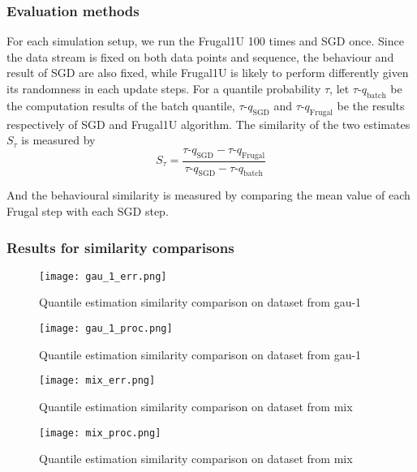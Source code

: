 \subsubsection{Evaluation methods}

For each simulation setup, we run the Frugal1U 100 times and SGD once. Since the data stream is fixed on both data points and sequence, the behaviour and result of SGD are also fixed, while Frugal1U is likely to perform differently given its randomness in each update steps. For a quantile probability $\tau$, let $\tau$-$q_{\text{batch}}$ be the computation results of the batch quantile, $\tau$-$q_{\text{SGD}}$ and $\tau$-$q_{\text{Frugal}}$ be the results respectively of SGD and Frugal1U algorithm. The similarity of the two estimates $S_\tau$ is measured by
\begin{equation}
    S_\tau = \frac{ \tau\text{-}q_{\text{SGD}} - \tau\text{-}q_{\text{Frugal}} }{ \tau\text{-}q_{\text{SGD}} - \tau\text{-}q_{\text{batch}} }
\end{equation}

And the behavioural similarity is measured by comparing the mean value of each Frugal step with each SGD step.


\subsubsection{Results for similarity comparisons}

\begin{figure}[h!]
    \centering
	\texttt{[image: gau\_1\_err.png]}
    \caption{Quantile estimation similarity comparison on dataset from gau-1}
    \label{fig: gau_1_err}
\end{figure}

\begin{figure}[h!]
    \centering
	\texttt{[image: gau\_1\_proc.png]}
    \caption{Quantile estimation similarity comparison on dataset from gau-1}
    \label{fig: gau_1_proc}
\end{figure}

\begin{figure}[h!]
    \centering
	\texttt{[image: mix\_err.png]}
    \caption{Quantile estimation similarity comparison on dataset from mix}
    \label{fig: mix_err}
\end{figure}

\begin{figure}[h!]
    \centering
	\texttt{[image: mix\_proc.png]}
    \caption{Quantile estimation similarity comparison on dataset from mix}
    \label{fig: mix_proc}
\end{figure}

